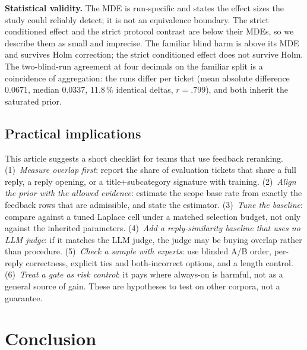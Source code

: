\documentclass{ieeeaccess}
\begin{document}
\textbf{Statistical validity.} The MDE is run-specific and states the effect sizes
the study could reliably detect; it is not an equivalence boundary. The strict
conditioned effect and the strict protocol contrast are below their MDEs, so we
describe them as small and imprecise. The familiar blind harm is above its MDE and
survives Holm correction; the strict conditioned effect does not survive Holm. The
two-blind-run agreement at four decimals on the familiar split is a coincidence
of aggregation: the runs differ per ticket (mean absolute difference 0.0671,
median 0.0337, 11.8\,\% identical deltas, $r=.799$), and both inherit the saturated
prior.

\subsection{Practical implications}
This article suggests a short checklist for teams that use feedback reranking.
(1)~\emph{Measure overlap first}: report the share of evaluation tickets that share
a full reply, a reply opening, or a title+subcategory signature with training.
(2)~\emph{Align the prior with the allowed evidence}: estimate the scope base rate
from exactly the feedback rows that are admissible, and state the estimator.
(3)~\emph{Tune the baseline}: compare against a tuned Laplace cell under a matched
selection budget, not only against the inherited parameters. (4)~\emph{Add a reply-similarity baseline that uses no LLM judge}: if it matches the LLM judge, the judge may be buying
overlap rather than procedure. (5)~\emph{Check a sample with experts}: use blinded
A/B order, per-reply correctness, explicit ties and both-incorrect options, and a
length control. (6)~\emph{Treat a gate as risk control}: it pays where always-on is
harmful, not as a general source of gain. These are hypotheses to test on other
corpora, not a guarantee.


\section{Conclusion}
\label{sec:conclusion}
\end{document}
